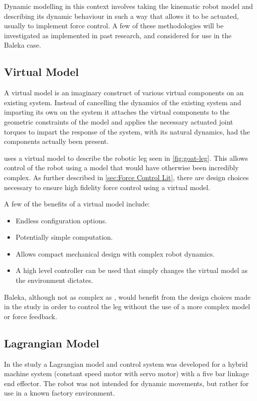 Dynamic modelling in this context involves taking the kinematic robot model and describing its dynamic behaviour in such a way that allows it to be actuated, usually to implement force control. A few of these methodologies will be investigated as implemented in past research, and considered for use in the Baleka case.

\subsection{Virtual Model}

A virtual model is an imaginary construct of various virtual components on an existing system. Instead of cancelling the dynamics of the existing system and imparting its own on the system it attaches the virtual components to the geometric constraints of the model and applies the necessary actuated joint torques to impart the response of the system, with its natural dynamics, had the components actually been present.\cite{Pratt2001} 

\cite{Kalouche2016} uses a virtual model to describe the robotic leg seen in \cref{fig:goat-leg}. This allows control of the robot using a model that would have otherwise been incredibly complex. As further described in \cref{sec:Force Control Lit}, there are design choices necessary to ensure high fidelity force control using a virtual model.

A few of the benefits of a virtual model include:\cite{Pratt2001} 
\begin{itemize}
\item Endless configuration options.
\item Potentially simple computation.
\item Allows compact mechanical design with complex robot dynamics.
\item A high level controller can be used that simply changes the virtual model as the environment dictates.
\end{itemize}

Baleka, although not as complex as \cite{Kalouche2016}, would benefit from the design choices made in the study in order to control the leg without the use of a more complex model or force feedback.

\subsection{Lagrangian Model}

In the study \cite{Yu2006} a Lagrangian model and control system was developed for a hybrid machine system (constant speed motor with servo motor) with a five bar linkage end effector. The robot was not intended for dynamic movements, but rather for use in a known factory environment. 

